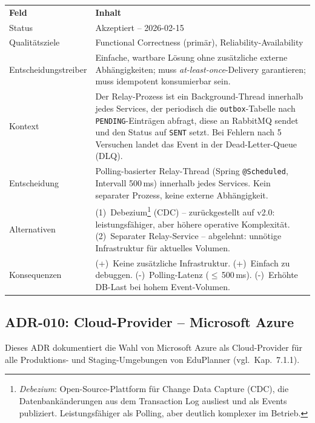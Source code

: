 \begin{tabularx}{\textwidth}{L{3.5cm} X}
  \color{white}\textbf{Feld} & \color{white}\textbf{Inhalt} \\
  Status & Akzeptiert -- 2026-02-15 \\
  Qualitätsziele & Functional Correctness (primär), Reliability-Availability \\
  Entscheidungstreiber & Einfache, wartbare Lösung ohne zusätzliche externe Abhängigkeiten; muss \textit{at-least-once}-Delivery garantieren; muss idempotent konsumierbar sein. \\
  Kontext & Der Relay-Prozess ist ein Background-Thread innerhalb jedes Services, der periodisch die \texttt{outbox}-Tabelle nach \texttt{PENDING}-Einträgen abfragt, diese an RabbitMQ sendet und den Status auf \texttt{SENT} setzt. Bei Fehlern nach 5 Versuchen landet das Event in der Dead-Letter-Queue (DLQ). \\
  Entscheidung & Polling-basierter Relay-Thread (Spring \texttt{@Scheduled}, Intervall 500\,ms) innerhalb jedes Services. Kein separater Prozess, keine externe Abhängigkeit. \\
  Alternativen & (1)~Debezium\footnote{\textit{Debezium}: Open-Source-Plattform für Change Data Capture (CDC), die Datenbankänderungen aus dem Transaction Log ausliest und als Events publiziert. Leistungsfähiger als Polling, aber deutlich komplexer im Betrieb.} (CDC) -- zurückgestellt auf v2.0: leistungsfähiger, aber höhere operative Komplexität. (2)~Separater Relay-Service -- abgelehnt: unnötige Infrastruktur für aktuelles Volumen. \\
  Konsequenzen & (+)~Keine zusätzliche Infrastruktur. (+)~Einfach zu debuggen. (-)~Polling-Latenz ($\leq$\,500\,ms). (-)~Erhöhte DB-Last bei hohem Event-Volumen. \\
\end{tabularx}

\subsection{ADR-010: Cloud-Provider -- Microsoft Azure}

Dieses ADR dokumentiert die Wahl von Microsoft Azure als Cloud-Provider für alle
Produktions- und Staging-Umgebungen von EduPlanner (vgl.\ Kap.~7.1.1).

